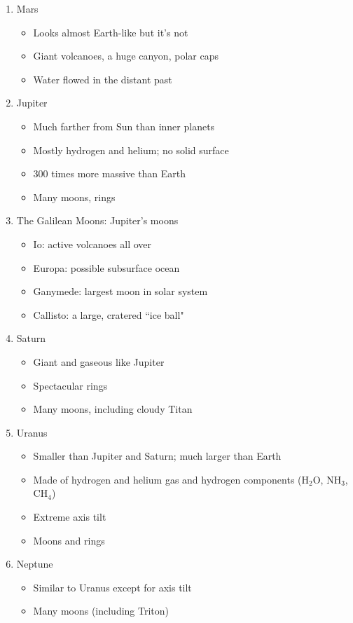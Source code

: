 \documentclass[12pt]{article}
\begin{document}
\begin{enumerate}
\item Mars \begin{itemize}
\item Looks almost Earth-like but it's not 
\item Giant volcanoes, a huge canyon, polar caps
\item Water flowed in the distant past \end{itemize} 
\item Jupiter \begin{itemize} 
\item Much farther from Sun than inner planets 
\item Mostly hydrogen and helium; no solid surface
\item 300 times more massive than Earth
\item Many moons, rings \end{itemize} 
\item The Galilean Moons: Jupiter's moons \begin{itemize} 
\item Io: active volcanoes all over 
\item Europa: possible subsurface ocean 
\item Ganymede: largest moon in solar system 
\item Callisto: a large, cratered ``ice ball" \end{itemize} 
\item Saturn \begin{itemize} 
\item Giant and gaseous like Jupiter 
\item Spectacular rings 
\item Many moons, including cloudy Titan \end{itemize} 
\item Uranus \begin{itemize} 
\item Smaller than Jupiter and Saturn; much larger than Earth 
\item Made of hydrogen and helium gas and hydrogen components (H$_2$O, NH$_3$, CH$_4$)
\item Extreme axis tilt 
\item Moons and rings \end{itemize} 
\item Neptune \begin{itemize} 
\item Similar to Uranus except for axis tilt 
\item Many moons (including Triton)

\end{itemize}
\end{enumerate}
\end{document}
